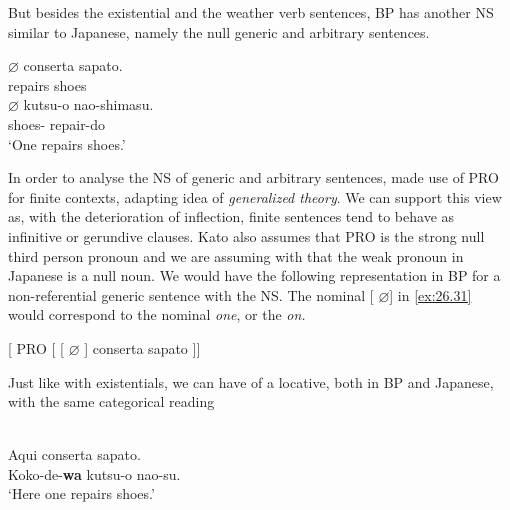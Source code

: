 \documentclass[output=paper]{langsci/langscibook}
\begin{document}
But besides the existential and the weather verb sentences,
\gls{BP} has another NS similar to Japanese, namely
the null generic and arbitrary sentences.

\ea%
    \label{ex:26.30}
    \ea
	\gll	$\varnothing$ conserta sapato.\\
			{}  repairs shoes\\
    \ex
	\gll	$\varnothing$ kutsu-o       nao-shimasu.\\
            {}  shoes-\Acc{}   repair-do\\
	\glt	\enquote*{One repairs shoes.}
    \z
\z

In order to analyse the NS of generic and arbitrary sentences, \citet{Kato2000}
made use of PRO for finite contexts, adapting  idea of
\emph{generalized  theory}.  We can support this view as, with the
deterioration of inflection, finite sentences tend to behave as infinitive or
gerundive clauses. Kato also assumes that PRO is the strong null third person
pronoun and we are assuming with \citet{Tomioka2003} that the weak pronoun in
Japanese is a null noun. We would have the following representation in
\gls{BP} for a non-referential generic sentence with
the NS.  The nominal [ $\varnothing$] in \eqref{ex:26.31} would
correspond to the  nominal \emph{one}, or the 
\emph{on.}

\ea%
    \label{ex:26.31}
    {}[ PRO [ [ $\varnothing$ ] conserta sapato ]]
\z

Just like with existentials, we can have  of a locative, both in
\gls{BP}  and Japanese, with the same categorical
reading

\ea%
    \label{ex:26.36bp}
    \ea{}\\
        Aqui conserta sapato.
    \ex{}\\
        Koko-de-\textbf{wa}  kutsu-o nao-su.\\
        ‘Here one repairs shoes.’
    \z
\z
\end{document}
